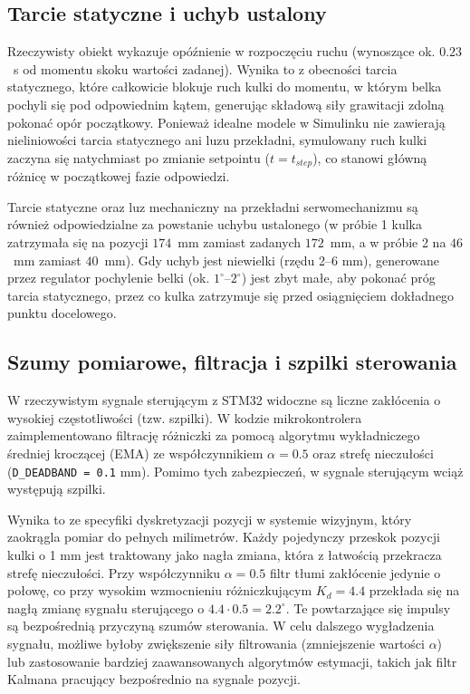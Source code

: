 \subsection{Tarcie statyczne i uchyb ustalony}
Rzeczywisty obiekt wykazuje opóźnienie w rozpoczęciu ruchu (wynoszące ok.
$0.23$~s od momentu skoku wartości zadanej). Wynika to z obecności tarcia
statycznego, które całkowicie blokuje ruch kulki do momentu, w którym
belka pochyli się pod odpowiednim kątem, generując składową siły grawitacji
zdolną pokonać opór początkowy. Ponieważ idealne modele w Simulinku nie zawierają
nieliniowości tarcia statycznego ani luzu przekładni, symulowany ruch kulki
zaczyna się natychmiast po zmianie setpointu ($t = t_{step}$), co stanowi główną
różnicę w początkowej fazie odpowiedzi.

Tarcie statyczne oraz luz mechaniczny na przekładni serwomechanizmu
są również odpowiedzialne za powstanie uchybu ustalonego (w próbie 1 kulka
zatrzymała się na pozycji $174$~mm zamiast zadanych $172$~mm, a w próbie 2 na
$46$~mm zamiast $40$~mm). Gdy uchyb jest niewielki (rzędu 2--6 mm), generowane
przez regulator pochylenie belki (ok. $1^{\circ}$--$2^{\circ}$) jest zbyt małe,
aby pokonać próg tarcia statycznego, przez co kulka zatrzymuje się przed
osiągnięciem dokładnego punktu docelowego.

\subsection{Szumy pomiarowe, filtracja i szpilki sterowania}
W rzeczywistym sygnale sterującym z STM32 widoczne są liczne zakłócenia o wysokiej
częstotliwości (tzw. szpilki). W kodzie mikrokontrolera
zaimplementowano filtrację różniczki za pomocą algorytmu wykładniczego średniej
kroczącej (EMA) ze współczynnikiem $\alpha = 0.5$ oraz strefę nieczułości
(\texttt{D\_DEADBAND = 0.1} mm). Pomimo tych zabezpieczeń, w sygnale sterującym
wciąż występują szpilki.

Wynika to ze specyfiki dyskretyzacji pozycji w systemie wizyjnym, który zaokrągla
pomiar do pełnych milimetrów. Każdy pojedynczy przeskok pozycji kulki o 1 mm
jest traktowany jako nagła zmiana, która z łatwością przekracza strefę nieczułości.
Przy współczynniku $\alpha = 0.5$ filtr tłumi zakłócenie jedynie o połowę, co przy
wysokim wzmocnieniu różniczkującym $K_d = 4.4$ przekłada się na nagłą zmianę
sygnału sterującego o $4.4 \cdot 0.5 = 2.2^{\circ}$. Te powtarzające się impulsy
są bezpośrednią przyczyną szumów sterowania. W celu dalszego wygładzenia sygnału,
możliwe byłoby zwiększenie siły filtrowania (zmniejszenie wartości $\alpha$) lub
zastosowanie bardziej zaawansowanych algorytmów estymacji, takich jak filtr
Kalmana pracujący bezpośrednio na sygnale pozycji.

